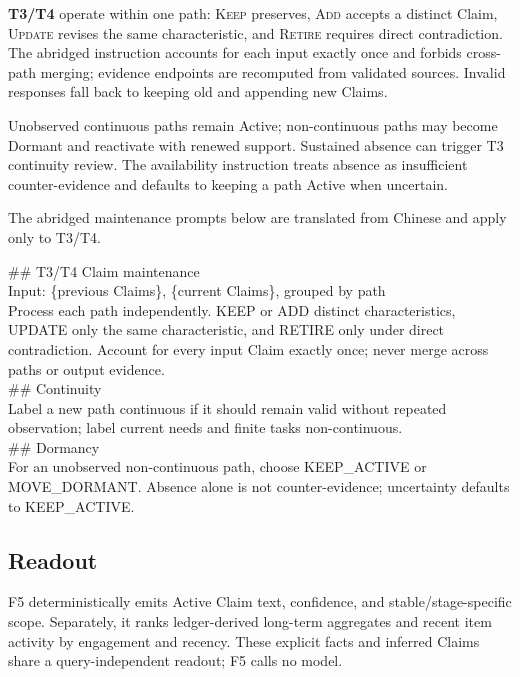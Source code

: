 \documentclass[sigconf,nonacm,balance=false]{acmart}
\begin{document}
\textbf{T3/T4} operate within one path: \textsc{Keep} preserves, \textsc{Add} accepts a distinct Claim, \textsc{Update} revises the same characteristic, and \textsc{Retire} requires direct contradiction. The abridged instruction accounts for each input exactly once and forbids cross-path merging; evidence endpoints are recomputed from validated sources. Invalid responses fall back to keeping old and appending new Claims.

Unobserved continuous paths remain Active; non-continuous paths may become Dormant and reactivate with renewed support. Sustained absence can trigger T3 continuity review. The availability instruction treats absence as insufficient counter-evidence and defaults to keeping a path Active when uncertain.

The abridged maintenance prompts below are translated from Chinese and apply only to T3/T4.

\begin{tcolorbox}[breakable, colback=black!2, colframe=black!25, boxrule=0.3pt, arc=1mm, left=4pt, right=4pt, top=3pt, bottom=3pt, before skip=4pt, after skip=4pt]
\footnotesize\ttfamily\RaggedRight
        \#\# T3/T4 Claim maintenance\\
        Input: \{previous Claims\}, \{current Claims\}, grouped by path\\
        Process each path independently. KEEP or ADD distinct characteristics, UPDATE only the same characteristic, and RETIRE only under direct contradiction. Account for every input Claim exactly once; never merge across paths or output evidence.\\[0.3em]
        \#\# Continuity\\
        Label a new path continuous if it should remain valid without repeated observation; label current needs and finite tasks non-continuous.\\[0.3em]
        \#\# Dormancy\\
        For an unobserved non-continuous path, choose KEEP\_ACTIVE or MOVE\_DORMANT. Absence alone is not counter-evidence; uncertainty defaults to KEEP\_ACTIVE.
\end{tcolorbox}

\subsection{Readout}
\label{app:method-readout}
F5 deterministically emits Active Claim text, confidence, and stable/stage-specific scope. Separately, it ranks ledger-derived long-term aggregates and recent item activity by engagement and recency. These explicit facts and inferred Claims share a query-independent readout; F5 calls no model.
\end{document}
